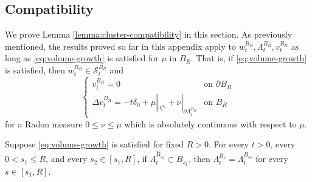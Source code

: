 \documentclass[12pt]{amsart}
\numberwithin{equation}{section}
\newcommand{\mclS}[2]{\hyperref[eq:super-solutions]{\mathcal{S}^{#1}_{#2}}}
\newcommand{\lss}[2]{\hyperref[eq:least-super-solution]{w^{#1}_{#2}}}
\newcommand{\cluster}[2]{\hyperref[eq:non-co-set]{\mathit{\Lambda}^{#1}_{#2}}}
\newcommand{\odometer}[2]{\hyperref[eq:limit-odometer]{v^{#1}_{#2}}}
\begin{document}
	
	\subsection{Compatibility}
	We prove Lemma \ref{lemma:cluster-compatibility} in this section.
	As previously mentioned, the results proved so far in this appendix apply to $\lss{B_R}{t}, \cluster{B_R}{t}, \odometer{B_R}{t}$ as long as \eqref{eq:volume-growth}
	is satisfied for $\mu$ in $B_R$. That is, if \eqref{eq:volume-growth} is satisfied, then $\lss{B_R}{t} \in \mclS{B_R}{t}$ and
	\begin{equation} \label{eq:laplacian-of-v-general}
	\begin{cases}
	\odometer{B_R}{t} = 0  &\mbox{on $\partial B_R$} \\
	\Delta \odometer{B_R}{t} = -t \delta_0 + \mu |_{_{\cluster{B_R}{t}}} + \nu |_{\partial \cluster{B_R}{t}} &\mbox{on $B_R$}
	\end{cases}
	\end{equation}
	for a Radon measure $0 \leq \nu \leq \mu$ which is absolutely continuous with respect to $\mu$. 
	
	
	
	
	\begin{lemma} \label{lemma:appendix-cluster-compatibility}
		Suppose \eqref{eq:volume-growth} is satisfied for fixed $R > 0$. 
		For every $t>0$, every $0<s_1 \leq R$, and every $s_2 \in [s_1, R]$, if $\overline{\cluster{B_{s_2}}{t}} \subset B_{s_1}$, 
		then $\cluster{B_{s}}{t} = \cluster{B_{s_2}}{t}$ for every $s \in [s_1, R]$.
	\end{lemma}
\end{document}

